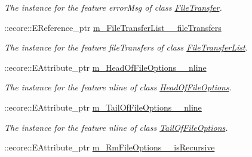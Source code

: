 \begin{DoxyCompactItemize}
\begin{DoxyCompactList}\small\item\em The instance for the feature errorMsg of class \hyperlink{classFMS__Data_1_1FileTransfer}{FileTransfer}. \item\end{DoxyCompactList}\item 
\hypertarget{classFMS__Data_1_1FMS__DataPackage_a9e9bf5cd8fd269c46a2e65bd6d4ca9f9}{
::ecore::EReference\_\-ptr \hyperlink{classFMS__Data_1_1FMS__DataPackage_a9e9bf5cd8fd269c46a2e65bd6d4ca9f9}{m\_\-FileTransferList\_\-\_\-fileTransfers}}
\label{classFMS__Data_1_1FMS__DataPackage_a9e9bf5cd8fd269c46a2e65bd6d4ca9f9}

\begin{DoxyCompactList}\small\item\em The instance for the feature fileTransfers of class \hyperlink{classFMS__Data_1_1FileTransferList}{FileTransferList}. \item\end{DoxyCompactList}\item 
\hypertarget{classFMS__Data_1_1FMS__DataPackage_ac8fe56d2145f09d28b119ecae6df9d3d}{
::ecore::EAttribute\_\-ptr \hyperlink{classFMS__Data_1_1FMS__DataPackage_ac8fe56d2145f09d28b119ecae6df9d3d}{m\_\-HeadOfFileOptions\_\-\_\-nline}}
\label{classFMS__Data_1_1FMS__DataPackage_ac8fe56d2145f09d28b119ecae6df9d3d}

\begin{DoxyCompactList}\small\item\em The instance for the feature nline of class \hyperlink{classFMS__Data_1_1HeadOfFileOptions}{HeadOfFileOptions}. \item\end{DoxyCompactList}\item 
\hypertarget{classFMS__Data_1_1FMS__DataPackage_adb6ab25068ff6e82cb972280fa4ad722}{
::ecore::EAttribute\_\-ptr \hyperlink{classFMS__Data_1_1FMS__DataPackage_adb6ab25068ff6e82cb972280fa4ad722}{m\_\-TailOfFileOptions\_\-\_\-nline}}
\label{classFMS__Data_1_1FMS__DataPackage_adb6ab25068ff6e82cb972280fa4ad722}

\begin{DoxyCompactList}\small\item\em The instance for the feature nline of class \hyperlink{classFMS__Data_1_1TailOfFileOptions}{TailOfFileOptions}. \item\end{DoxyCompactList}\item 
\hypertarget{classFMS__Data_1_1FMS__DataPackage_a357b35bc0bc09e1a64f2baf2931478d3}{
::ecore::EAttribute\_\-ptr \hyperlink{classFMS__Data_1_1FMS__DataPackage_a357b35bc0bc09e1a64f2baf2931478d3}{m\_\-RmFileOptions\_\-\_\-isRecursive}}
\label{classFMS__Data_1_1FMS__DataPackage_a357b35bc0bc09e1a64f2baf2931478d3}


\end{DoxyCompactItemize}
